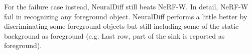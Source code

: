 For the failure case instead, NeuralDiff still beats NeRF-W. In detail, NeRF-W fail 
in recognizing any foreground object. NeuralDiff performs a little better by discriminating
some foreground objects but still including some of the static background as foreground
(e.g. Last row, part of the sink is reported as foreground).
